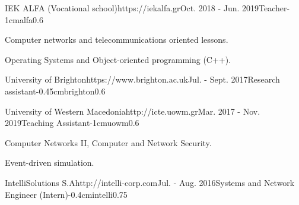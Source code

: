 \documentclass{mycv}
\begin{document}
	\vspace*{0.5cm}
	
	\begin{EntryDatedLogo}{IEK ALFA (Vocational school)}{https://iekalfa.gr}{Oct. 2018 - Jun. 2019}{Teacher}{-1cm}{alfa}{0.6}
		\begin{Itemize}
			\item Computer networks and telecommunications oriented lessons.
			\item Operating Systems and Object-oriented programming (C++).
		\end{Itemize}
	\end{EntryDatedLogo}

	\vspace*{0.5cm}
		
	\begin{EntryDatedLogo}{University of Brighton}{https://www.brighton.ac.uk}{Jul. - Sept. 2017}{Research assistant}{-0.45cm}{brighton}{0.6}
	\end{EntryDatedLogo}

	\vspace*{0.5cm}	

	\begin{EntryDatedLogo}{University of Western Macedonia}{http://icte.uowm.gr}{Mar. 2017 - Nov. 2019}{Teaching Assistant}{-1cm}{uowm}{0.6}
	\begin{Itemize}
		\item Computer Networks II, Computer and Network Security.
		\item Event-driven simulation.
	\end{Itemize}
	\end{EntryDatedLogo}

	\vspace*{0.75cm}	

	\begin{EntryDatedLogo}{IntelliSolutions S.A}{http://intelli-corp.com}{Jul. - Aug. 2016}{Systems and Network Engineer (Intern)}{-0.4cm}{intelli}{0.75}
	\end{EntryDatedLogo}
	\newpage
\end{document}

